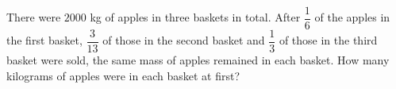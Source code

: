 There were $2000$ kg of apples in three baskets in total. After $\dfrac{1}{6}$ of the apples in the first basket, $\dfrac{3}{13}$ of those in the second basket and $\dfrac{1}{3}$ of those in the third basket were sold, the same mass of apples remained in each basket. How many kilograms of apples were in each basket at first?
